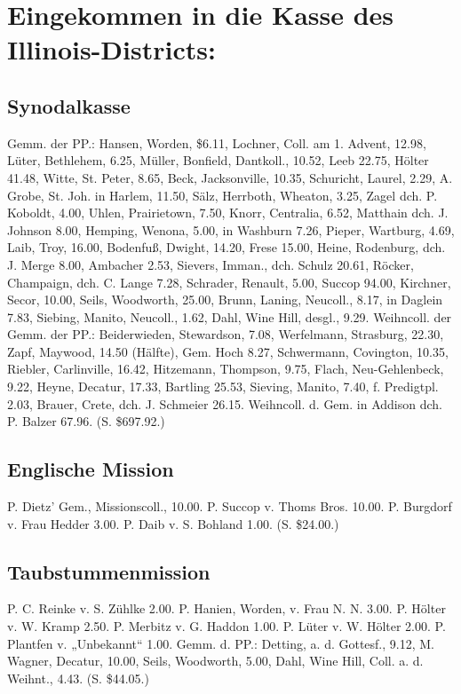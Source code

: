 \chapter[Kasse des Illinois-Districts:]{Eingekommen in die Kasse des Illinois-Districts:}

\section{Synodalkasse}

Gemm. der PP.: Hansen, Worden, \$6.11, Lochner, Coll. am 1. Advent, 12.98, Lüter, Bethlehem, 6.25, Müller, Bonfield, Dantkoll., 10.52, Leeb 22.75, Hölter 41.48, Witte, St. Peter, 8.65, Beck, Jacksonville, 10.35, Schuricht, Laurel, 2.29, A. Grobe, St. Joh. in Harlem, 11.50, Sälz, Herrboth, Wheaton, 3.25, Zagel dch. P. Koboldt, 4.00, Uhlen, Prairietown, 7.50, Knorr, Centralia, 6.52, Matthain dch. J. Johnson 8.00, Hemping, Wenona, 5.00, in Washburn 7.26, Pieper, Wartburg, 4.69, Laib, Troy, 16.00, Bodenfuß, Dwight, 14.20, Frese 15.00, Heine, Rodenburg, dch. J. Merge 8.00, Ambacher 2.53, Sievers, Imman., dch. Schulz 20.61, Röcker, Champaign, dch. C. Lange 7.28, Schrader, Renault, 5.00, Succop 94.00, Kirchner, Secor, 10.00, Seils, Woodworth, 25.00, Brunn, Laning, Neucoll., 8.17, in Daglein 7.83, Siebing, Manito, Neucoll., 1.62, Dahl, Wine Hill, desgl., 9.29. Weihncoll. der Gemm. der PP.: Beiderwieden, Stewardson, 7.08, Werfelmann, Strasburg, 22.30, Zapf, Maywood, 14.50 (Hälfte), Gem. Hoch 8.27, Schwermann, Covington, 10.35, Riebler, Carlinville, 16.42, Hitzemann, Thompson, 9.75, Flach, Neu-Gehlenbeck, 9.22, Heyne, Decatur, 17.33, Bartling 25.53, Sieving, Manito, 7.40, f. Predigtpl. 2.03, Brauer, Crete, dch. J. Schmeier 26.15. Weihncoll. d. Gem. in Addison dch. P. Balzer 67.96. (S. \$697.92.)

\section{Englische Mission}

P. Dietz’ Gem., Missionscoll., 10.00. P. Succop v. Thoms Bros. 10.00. P. Burgdorf v. Frau Hedder 3.00. P. Daib v. S. Bohland 1.00. (S. \$24.00.)

\section{Taubstummenmission}

P. C. Reinke v. S. Zühlke 2.00. P. Hanien, Worden, v. Frau N. N. 3.00. P. Hölter v. W. Kramp 2.50. P. Merbitz v. G. Haddon 1.00. P. Lüter v. W. Hölter 2.00. P. Plantfen v. „Unbekannt“ 1.00. Gemm. d. PP.: Detting, a. d. Gottesf., 9.12, M. Wagner, Decatur, 10.00, Seils, Woodworth, 5.00, Dahl, Wine Hill, Coll. a. d. Weihnt., 4.43. (S. \$44.05.)

